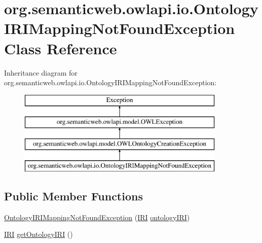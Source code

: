 \hypertarget{classorg_1_1semanticweb_1_1owlapi_1_1io_1_1_ontology_i_r_i_mapping_not_found_exception}{\section{org.\-semanticweb.\-owlapi.\-io.\-Ontology\-I\-R\-I\-Mapping\-Not\-Found\-Exception Class Reference}
\label{classorg_1_1semanticweb_1_1owlapi_1_1io_1_1_ontology_i_r_i_mapping_not_found_exception}
}
Inheritance diagram for org.\-semanticweb.\-owlapi.\-io.\-Ontology\-I\-R\-I\-Mapping\-Not\-Found\-Exception\-:\begin{figure}[H]
\begin{center}
\leavevmode
\includegraphics[height=4.000000cm]{classorg_1_1semanticweb_1_1owlapi_1_1io_1_1_ontology_i_r_i_mapping_not_found_exception}
\end{center}
\end{figure}
\subsection*{Public Member Functions}
\begin{DoxyCompactItemize}
\item 
\hyperlink{classorg_1_1semanticweb_1_1owlapi_1_1io_1_1_ontology_i_r_i_mapping_not_found_exception_a4192388547c0dfff701fc675d60d25d6}{Ontology\-I\-R\-I\-Mapping\-Not\-Found\-Exception} (\hyperlink{classorg_1_1semanticweb_1_1owlapi_1_1model_1_1_i_r_i}{I\-R\-I} \hyperlink{classorg_1_1semanticweb_1_1owlapi_1_1io_1_1_ontology_i_r_i_mapping_not_found_exception_a92f0ecaca4878a3b3a4afc990f000dab}{ontology\-I\-R\-I})
\item 
\hyperlink{classorg_1_1semanticweb_1_1owlapi_1_1model_1_1_i_r_i}{I\-R\-I} \hyperlink{classorg_1_1semanticweb_1_1owlapi_1_1io_1_1_ontology_i_r_i_mapping_not_found_exception_a32d9c8caab61c8a899e8f4b107e0ef6e}{get\-Ontology\-I\-R\-I} ()
\end{DoxyCompactItemize}
